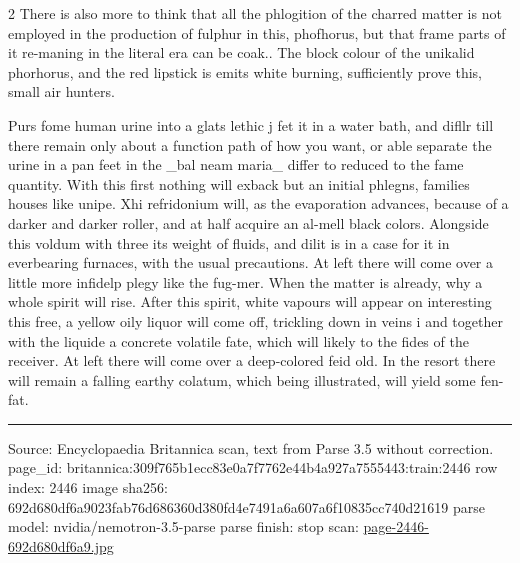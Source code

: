 \documentclass[10pt]{article}
\begin{document}
\begin{multicols}{2}
There is also more to think that all the phlogition of the charred matter is not employed in the production of fulphur in this, phofhorus, but that frame parts of it re-maning in the literal era can be coak.. The block colour of the unikalid phorhorus, and the red lipstick is emits white burning, sufficiently prove this, small air hunters.

Purs fome human urine into a glats lethic j fet it in a water bath, and difllr till there remain only about a function path of how you want, or able separate the urine in a pan feet in the \_bal neam maria\_ differ to reduced to the fame quantity. With this first nothing will exback but an initial phlegns, families houses like unipe. Xhi refridonium will, as the evaporation advances, because of a darker and darker roller, and at half acquire an al-mell black colors. Alongside this voldum with three its weight of fluids, and dilit is in a case for it in everbearing furnaces, with the usual precautions. At left there will come over a little more infidelp plegy like the fug-mer. When the matter is already, why a whole spirit will rise. After this spirit, white vapours will appear on interesting this free, a yellow oily liquor will come off, trickling down in veins i and together with the liquide a concrete volatile fate, which will likely to the fides of the receiver. At left there will come over a deep-colored feid old. In the resort there will remain a falling earthy colatum, which being illustrated, will yield some fen-fat.

\end{multicols}
\vfill\par\noindent\rule{\linewidth}{0.4pt}\par
{\scriptsize\color{gray}\noindent Source: Encyclopaedia Britannica scan, text from Parse 3.5 without correction. page\_id: britannica:309f765b1ecc83e0a7f7762e44b4a927a7555443:train:2446 \quad row index: 2446 \quad image sha256: 692d680df6a9023fab76d686360d380fd4e7491a6a607a6f10835cc740d21619 \quad parse model: nvidia/nemotron-3.5-parse \quad parse finish: stop \quad scan: \href{../scans/page-2446-692d680df6a9.jpg}{page-2446-692d680df6a9.jpg}\par}
\end{document}
